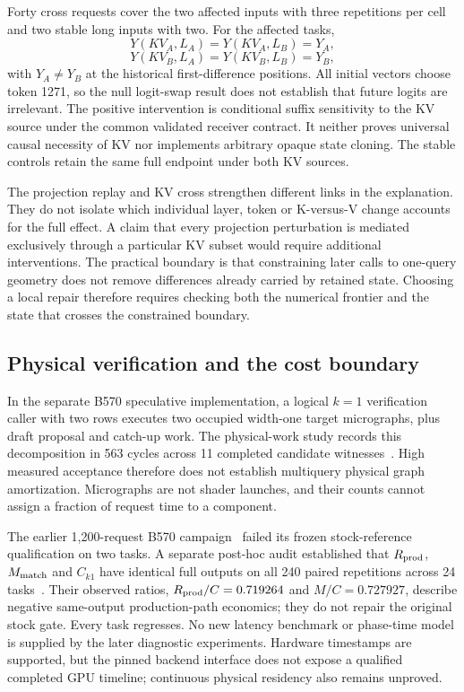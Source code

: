 Forty cross requests cover the two affected inputs with three repetitions per cell and two stable long inputs with two. For the affected tasks,
\begin{equation}
Y(KV_A,L_A)=Y(KV_A,L_B)=Y_A,
\end{equation}
\begin{equation}
Y(KV_B,L_A)=Y(KV_B,L_B)=Y_B,
\end{equation}
with $Y_A\ne Y_B$ at the historical first-difference positions. All initial vectors choose token 1271, so the null logit-swap result does not establish that future logits are irrelevant. The positive intervention is conditional suffix sensitivity to the KV source under the common validated receiver contract. It neither proves universal causal necessity of KV nor implements arbitrary opaque state cloning. The stable controls retain the same full endpoint under both KV sources.

The projection replay and KV cross strengthen different links in the explanation. They do not isolate which individual layer, token or K-versus-V change accounts for the full effect. A claim that every projection perturbation is mediated exclusively through a particular KV subset would require additional interventions. The practical boundary is that constraining later calls to one-query geometry does not remove differences already carried by retained state. Choosing a local repair therefore requires checking both the numerical frontier and the state that crosses the constrained boundary.

\subsection{Physical verification and the cost boundary}
In the separate B570 speculative implementation, a logical $k=1$ verification caller with two rows executes two occupied width-one target micrographs, plus draft proposal and catch-up work. The physical-work study records this decomposition in 563 cycles across 11 completed candidate witnesses~\cite{bwork}. High measured acceptance therefore does not establish multiquery physical graph amortization. Micrographs are not shader launches, and their counts cannot assign a fraction of request time to a component.

The earlier 1,200-request B570 campaign~\cite{bcost} failed its frozen stock-reference qualification on two tasks. A separate post-hoc audit established that $R_{\rm prod}$, $M_{\rm match}$ and $C_{k 1}$ have identical full outputs on all 240 paired repetitions across 24 tasks~\cite{bpostaudit}. Their observed ratios, $R_{\rm prod}/C=0.719264$ and $M/C=0.727927$, describe negative same-output production-path economics; they do not repair the original stock gate. Every task regresses. No new latency benchmark or phase-time model is supplied by the later diagnostic experiments. Hardware timestamps are supported, but the pinned backend interface does not expose a qualified completed GPU timeline; continuous physical residency also remains unproved.
